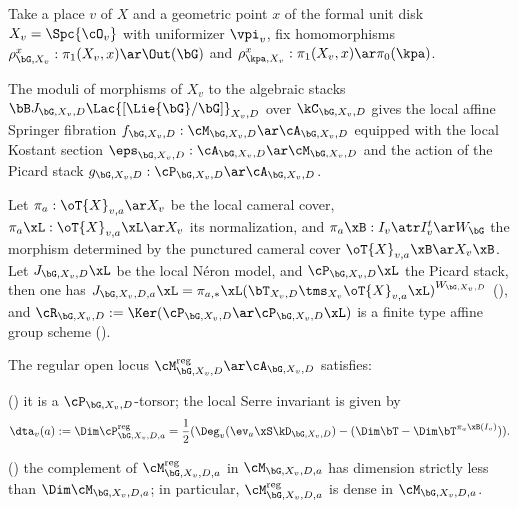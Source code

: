\documentclass[article, a4paper, twoside]{universal}
\begin{document}
\begin{stp}
	Take a place $v$ of $X$ and a geometric point $x$ of the formal unit disk $X_{v}=\Spc{\cO_{v}}$ with uniformizer $\vpi_{v}$, fix homomorphisms $\rho_{\bG,X_{v}}^{x}:\pi_{1}(X_{v},x)\ar\Out(\bG)$ and $\rho_{\kpa,X_{v}}^{x}:\pi_{1}(X_{v},x)\ar\pi_{0}(\kpa)$.

	The moduli of morphisms of $X_{v}$ to the algebraic stacks $\bB J_{\bG,X_{v},D}\Lac {[\Lie{\bG}/\bG]}_{X_{v},D}$ over $\kC_{\bG,X_{v},D}$ gives the local affine Springer fibration $f_{\bG,X_{v},D}:\cM_{\bG,X_{v},D}\ar\cA_{\bG,X_{v},D}$ equipped with the local Kostant section $\eps_{\bG,X_{v},D}:\cA_{\bG,X_{v},D}\ar\cM_{\bG,X_{v},D}$ and the action of the Picard stack $g_{\bG,X_{v},D}:\cP_{\bG,X_{v},D}\ar\cA_{\bG,X_{v},D}$.

	Let $\pi_{a}:\oT{X}_{v,a}\ar X_{v}$ be the local cameral cover, $\pi_{a}\xL:\oT{X}_{v,a}\xL\ar X_{v}$ its normalization, and $\pi_{a}\xB:I_{v}\atr I_{v}^{t}\ar W_{\bG}$ the morphism determined by the punctured cameral cover $\oT{X}_{v,a}\xB\ar X_{v}\xB$. Let $J_{\bG,X_{v},D}\xL$ be the local N{\'e}ron model, and $\cP_{\bG,X_{v},D}\xL$ the Picard stack, then one has $J_{\bG,X_{v},D,a}\xL={\pi_{a,*}\xL(\bT_{X_{v},D}\tms_{X_{v}}\oT{X}_{v,a}\xL)}^{W_{\bG,X_{v},D}}$ (\cite[Proposition~3.8.2]{Ngo2010Lemme}), and $\cR_{\bG,X_{v},D}:=\Ker(\cP_{\bG,X_{v},D}\ar\cP_{\bG,X_{v},D}\xL)$ is a finite type affine group scheme (\cite[Lemma~3.8.1]{Ngo2010Lemme}).

\end{stp}

\begin{thm}
	The regular open locus $\cM_{\bG,X_{v},D}^{\text{reg}}\ar\cA_{\bG,X_{v},D}$ satisfies:
	\begin{itm}
		\item (\cite[Lemma~3.3.1, Proposition~3.7.5]{Ngo2010Lemme}) it is a $\cP_{\bG,X_{v},D}$-torsor; the local Serre invariant is given by
		\[
			\dta_{v}(a):=\Dim\cP_{\bG,X_{v},D,a}^{\text{reg}}=\frac{1}{2}(\Deg_{v}(\ev_{a}\xS\kD_{\bG,X_{v},D})-(\Dim\bT-\Dim\bT^{\pi_{a}\xB(I_{v})})).
		\]
		\item (\cite[Proposition~3.7.1, Proposition~3.10.1]{Ngo2010Lemme}) the complement of $\cM_{\bG,X_{v},D,a}^{\text{reg}}$ in $\cM_{\bG,X_{v},D,a}$ has dimension strictly less than $\Dim\cM_{\bG,X_{v},D,a}$; in particular, $\cM_{\bG,X_{v},D,a}^{\text{reg}}$ is dense in $\cM_{\bG,X_{v},D,a}$.
	\end{itm}
\end{thm}
\end{document}
